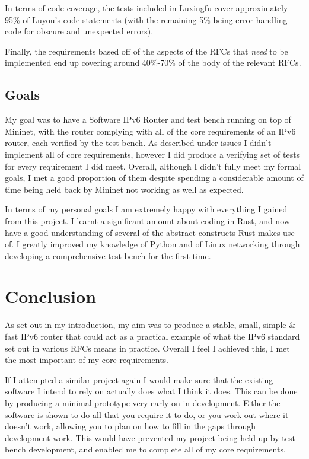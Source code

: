 \documentclass[12pt,a4paper,twoside,openright]{report}
\begin{document}
\bigskip

In terms of code coverage, the tests included in Luxingfu cover approximately 95\% of Luyou's code statements (with the remaining 5\% being error handling code for obscure and unexpected errors).

\bigskip

Finally, the requirements based off of the aspects of the RFCs that \textit{need} to be implemented end up covering around 40\%-70\% of the body of the relevant RFCs.

\section{Goals}

My goal was to have a Software IPv6 Router and test bench running on top of Mininet, with the router complying with all of the core requirements of an IPv6 router, each verified by the test bench.  As described under issues I didn't implement all of core requirements, however I did produce a verifying set of tests for every requirement I did meet.  Overall, although I didn't fully meet my formal goals, I met a good proportion of them despite spending a considerable amount of time being held back by Mininet not working as well as expected.

\bigskip

In terms of my personal goals I am extremely happy with everything I gained from this project.  I learnt a significant amount about coding in Rust, and now have a good understanding of several of the abstract constructs Rust makes use of.  I greatly improved my knowledge of Python and of Linux networking through developing a comprehensive test bench for the first time.


\chapter{Conclusion}

As set out in my introduction, my aim was to produce a stable, small, simple \& fast IPv6 router that could act as a practical example of what the IPv6 standard set out in various RFCs means in practice.  Overall I feel I achieved this, I met the most important of my core requirements.

\bigskip

If I attempted a similar project again I would make sure that the existing software I intend to rely on actually does what I think it does.  This can be done by producing a minimal prototype very early on in development.  Either the software is shown to do all that you require it to do, or you work out where it doesn't work, allowing you to plan on how to fill in the gaps through development work.  This would have prevented my project being held up by test bench development, and enabled me to complete all of my core requirements.
\end{document}
